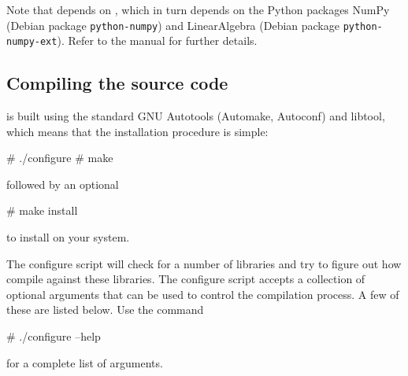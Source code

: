 Note that \ffc{} depends on \fiat{} , which in turn depends on
the Python packages NumPy~\cite{www:numpy} (Debian package \texttt{python-numpy}) and
LinearAlgebra (Debian package \texttt{python-numpy-ext}). Refer to
the \ffc{} manual for further details.



\subsection{Compiling the source code}

\dolfin{} is built using the standard GNU Autotools (Automake,
Autoconf) and libtool, which means that the installation procedure is simple:
\begin{code}
# ./configure
# make
\end{code}
followed by an optional
\begin{code}
# make install
\end{code}
to install \dolfin{} on your system.

The configure script will check for a number of libraries and try
to figure out how compile \dolfin{} against these libraries. The
configure script accepts a collection of optional arguments that can be
used to control the compilation process. A few of these are listed
below. Use the command
\begin{code}
# ./configure --help
\end{code}
for a complete list of arguments.


